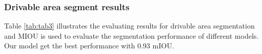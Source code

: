 \documentclass[10pt,twocolumn,letterpaper]{article}
\begin{document}
\begin{table}[htbp]
    \footnotesize
    \begin{center}
    \end{center}
    \caption{Results on traffic object detection.}
    \label{tab:tab2}
\end{table}

\subsubsection{Drivable area segment results}
Table \ref{tab:tab3} illustrates the evaluating results for drivable area segmentation and MIOU is used to evaluate the segmentation performance of different models. Our model get the best performance with 0.93 mIOU.  
\end{document}

